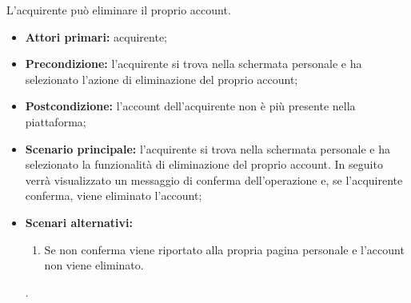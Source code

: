 
\label{eliminazione-account-acquirente}

L'acquirente può eliminare il proprio account.
\begin{itemize}
    \item \textbf{Attori primari:} acquirente;
    \item \textbf{Precondizione:} l'acquirente si trova nella schermata personale e ha selezionato l'azione di eliminazione del proprio account;
    \item \textbf{Postcondizione:} l'account dell'acquirente non è più presente nella piattaforma;
    \item \textbf{Scenario principale:} l'acquirente si trova nella schermata personale e ha selezionato la funzionalità di eliminazione del proprio account. In seguito verrà visualizzato un messaggio di conferma dell'operazione e, se l'acquirente conferma, viene eliminato l'account;
    \item \textbf{Scenari alternativi:}
    \begin{enumerate}[label=\lett]
        \item Se non conferma viene riportato alla propria pagina personale e l'account non viene eliminato.
    \end{enumerate}.
\end{itemize}

